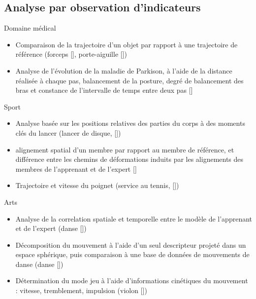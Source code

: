 \documentclass[svgnames]{beamer}
\newcommand{\mycite}[1]{[\textit{\cite{#1}}]}
\begin{document}
	\subsection{Analyse par observation d'indicateurs}
	\begin{frame}{\subsecname}
		\begin{block}{Domaine médical}
			\begin{itemize}[label=$\bullet$]
				\item Comparaison de la trajectoire d'un objet par rapport à une trajectoire de référence (forceps \mycite{Pham2010Tdg}, porte-aiguille \mycite{Despinoy2016UTS})
				\item Analyse de l'évolution de la maladie de Parkison, à l'aide de la distance réalisée à chaque pas, balancement de la posture, degré de balancement des bras et constance de l'intervalle de temps entre deux pas \mycite{Wang2013HMM}
			\end{itemize}
		\end{block}
	\end{frame}
	
	\begin{frame}{\subsecname}
		\begin{block}{Sport}
			\begin{itemize}[label=$\bullet$]
				\item Analyse basée sur les positions relatives des parties du corps à des moments clés du lancer (lancer de disque, \mycite{Yamaoka2013FoF})
				\item alignement spatial d'un membre par rapport au membre de référence, et différence entre les chemins de déformations induits par les alignements des membres de l’apprenant et de l’expert \mycite{Morel2017Mts}
				\item Trajectoire et vitesse du poignet (service au tennis, \mycite{Makio2007DoS})
			\end{itemize}
		\end{block}
	\end{frame}
	
	\begin{frame}{\subsecname}
		\begin{block}{Arts}
			\begin{itemize}[label=$\bullet$]
				\item Analyse de la correlation spatiale et temporelle entre le modèle de l'apprenant et de l'expert (danse \mycite{Maes2012DtM})			
				\item Décomposition du mouvement à l'aide d'un seul descripteur projeté dans un espace sphérique, puis comparaison à une base de données de mouvements de danse (danse \mycite{Kyan2015ABD})
				\item Détermination du mode jeu à l'aide d'informations cinétiques du mouvement : vitesse, tremblement, impulsion (violon \mycite{Rasamimanana2008EbA})
			\end{itemize}
		\end{block}
	\end{frame}
	
\end{document}
